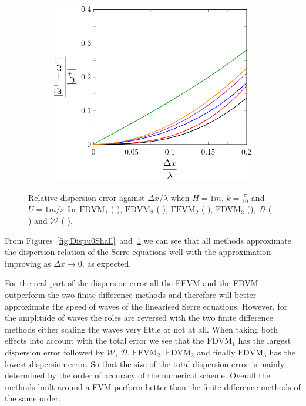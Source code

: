 \begin{figure}
\begin{subfigure}{0.5\textwidth}
	\end{subfigure}
	\par\bigskip
	\begin{subfigure}{0.5\textwidth}
		\includegraphics[width=\textwidth]{./chp4/figures/New/Dispu1Shall.pdf}
	\end{subfigure}
	\caption{Relative dispersion error against $\Delta x / \lambda$ when $H = 1m$, $k = \frac{\pi}{10}$ and $U = 1 m/s$ for $\text{FDVM}_1$ ({\color{green!60!black} \solidrule}), $\text{FDVM}_2$ ({\color{red} \solidrule}), $\text{FEVM}_2$ ({\color{blue} \solidrule}), $\text{FDVM}_3$ ({\solidrule}), $\mathcal{D}$ ({\color{violet!80!white} \solidrule}) and $\mathcal{W}$ ({\color{orange} \solidrule}).}
	\label{fig:Dispu1Shall}
\end{figure}

From Figures~\ref{fig:Dispu0Shall}~and~\ref{fig:Dispu1Shall} we can see that all methods approximate the dispersion relation of the Serre equations well with the approximation improving as $\Delta x \rightarrow 0$, as expected.

For the real part of the dispersion error all the FEVM and the FDVM outperform the two finite difference methods and therefore will better approximate the speed of waves of the linearised Serre equations. However, for the amplitude of waves the roles are reversed with the two finite difference methods either scaling the waves very little or not at all. When taking both effects into account with the total error we see that the $\text{FDVM}_1$ has the largest dispersion error followed by $\mathcal{W}$, $\mathcal{D}$, $\text{FEVM}_2$, $\text{FDVM}_2$ and finally $\text{FDVM}_3$ has the lowest dispersion error. So that the size of the total dispersion error is mainly determined by the order of accuracy of the numerical scheme. Overall the methods built around a FVM perform better than the finite difference methods of the same order. 

